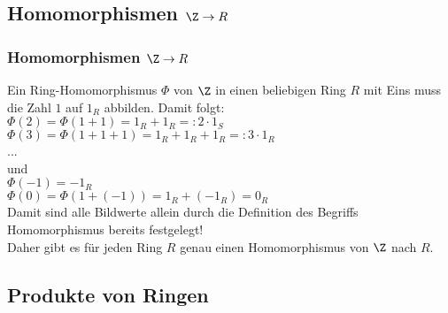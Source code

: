 \subsection{Homomorphismen $\Z \to R$}
%
\begin{frame}\frametitle{Homomorphismen $\Z \to R$}
Ein Ring-Homomorphismus $\Phi$ von $\Z$ in einen beliebigen Ring $R$ mit Eins muss die Zahl $1$ auf $1_R$ abbilden. Damit folgt:\\\vspace{2mm} \pause
$\Phi(2)=\Phi(1+1)=1_R+1_R=:2\cdot 1_S$\\ \pause
$\Phi(3)=\Phi(1+1+1)=1_R+1_R+1_R=:3\cdot 1_R$\\
...\\\vspace{2mm}
und \pause\\\vspace{2mm}
$\Phi(-1)=-1_R$\\\pause
$\Phi(0)=\Phi(1+(-1))=1_R+(-1_R)=0_R$\\
\vspace{2mm}\pause
Damit sind alle Bildwerte allein durch die Definition des Begriffs Homomorphismus bereits festgelegt!\\\pause
Daher gibt es für jeden Ring $R$ genau einen Homomorphismus von $\Z$ nach $R$.




\end{frame}
%
\subsection{Produkte von Ringen}

